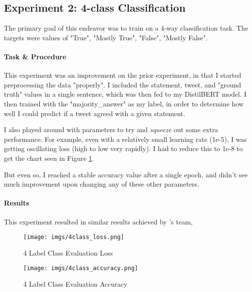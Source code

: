 \documentclass[14]{article}
\begin{document}
\subsection{Experiment 2: 4-class Classification}

The primary goal of this endeavor was to train on a 4-way classification task. The targets were values of "True", "Mostly True", "False", "Mostly False".

\paragraph{Task \& Procedure}

This experiment was an improvement on the prior experiment, in that I started preprocessing the data "properly". I included the statement, tweet, and "ground truth" values in a single sentence, which was then fed to my DistilBERT \cite{distilbert} model. I then trained with the "majority\_answer" as my label, in order to determine how well I could predict if a tweet agreed with a given statement.

I also played around with parameters to try and \textit{squeeze} out some extra performance. For example, even with a relatively small learning rate (1e-5), I was getting oscillating loss (high to low very rapidly). I had to reduce this to 1e-8 to get the chart seen in Figure \ref{fig:4class_loss}.

But even so, I reached a stable accuracy value after a single epoch, and didn't see much improvement upon changing any of these other parameters.

\paragraph{Results}

This experiment resulted in similar results achieved by \citet{truthseeker} 's team,

\begin{figure}[ht]
    \centering
    \texttt{[image: imgs/4class\_loss.png]}
    \caption{4 Label Class Evaluation Loss}
    \label{fig:4class_loss}
\end{figure}

\begin{figure}[ht]
    \centering
    \texttt{[image: imgs/4class\_accuracy.png]}
    \caption{4 Label Class Evaluation Accuracy}
    \label{fig:4class_accuracy}
\end{figure}
\end{document}
